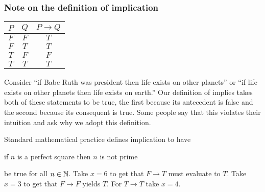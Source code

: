 \documentclass[10pt,t]{beamer}
\begin{document}
\begin{frame}
  \frametitle{Note on the definition of implication}
\begin{center}
  \begin{tabular}{cc|c}
    $P$  &$Q$  &$P \rightarrow Q$  \\ \hline
    $F$  &$F$  &$T$          \\
    $F$  &$T$  &$T$          \\
    $T$  &$F$  &$F$          \\
    $T$  &$T$  &$T$     
  \end{tabular}
\end{center}
Consider
``if Babe Ruth was president then life exists on other planets'' 
or ``if life exists on other planets then life exists on earth.'' 
Our definition of implies takes both of these statements to be true, 
the first because its antecedent is false 
and the second because its consequent is true.
Some people say that this violates their intuition and ask why we 
adopt this definition. 

\pause
Standard mathematical practice defines implication to have 
\begin{center}
  if $n$ is a perfect square then $n$ is not prime
\end{center}
be true for all $n\in\mathbb{N}$.  
Take $x=6$ to get that $F\rightarrow T$ must evaluate to $T$.  
Take $x=3$ to get that $F\rightarrow F$ yields $T$.
For $T\rightarrow T$ take $x=4$.
\end{frame}
\end{document}
